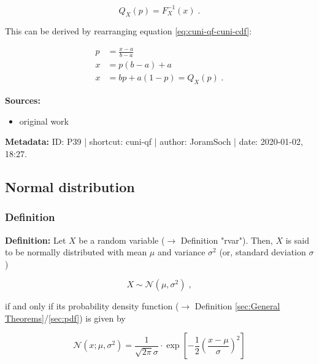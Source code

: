 \documentclass[a4paper,12pt]{book}
\begin{document}
\begin{equation} \label{eq:cuni-qf-cuni-qf-s1}
Q_X(p) = F_X^{-1}(x) \; .
\end{equation}

This can be derived by rearranging equation \eqref{eq:cuni-qf-cuni-cdf}:

\begin{equation} \label{eq:cuni-qf-cuni-cdf-s2}
\begin{split}
p &= \frac{x-a}{b-a} \\
x &= p(b-a) + a \\
x &= bp + a(1-p) = Q_X(p) \; .
\end{split}
\end{equation}

\vspace{1em}
\textbf{Sources:}
\begin{itemize}
\item original work\end{itemize}


\vspace{1em}
\textbf{Metadata:} ID: P39 | shortcut: cuni-qf | author: JoramSoch | date: 2020-01-02, 18:27.


\subsection{Normal distribution}

\subsubsection[\textit{Definition}]{Definition} \label{sec:norm}

\vspace{1em}
\textbf{Definition:} Let $X$ be a random variable ($\rightarrow$ Definition "rvar"). Then, $X$ is said to be normally distributed with mean $\mu$ and variance $\sigma^2$ (or, standard deviation $\sigma$)

\begin{equation} \label{eq:norm-norm}
X \sim \mathcal{N}(\mu, \sigma^2) \; ,
\end{equation}

if and only if its probability density function ($\rightarrow$ Definition \ref{sec:General Theorems}/\ref{sec:pdf}) is given by

\begin{equation} \label{eq:norm-norm-pdf}
\mathcal{N}(x; \mu, \sigma^2) = \frac{1}{\sqrt{2 \pi} \sigma} \cdot \exp \left[ -\frac{1}{2} \left( \frac{x-\mu}{\sigma} \right)^2 \right]
\end{equation}
\end{document}
